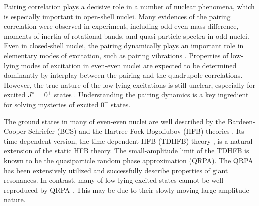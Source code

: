 \documentclass[%
superscriptaddress,
preprint,
showpacs,
nofootinbib,
amsmath,amssymb,
aps,
prc,
floatfix ]%
{revtex4-1}
\begin{document}
Pairing correlation plays a decisive role in a number of nuclear phenomena,
which is especially important in open-shell nuclei.
Many evidences of the pairing correlation were observed in experiment,
including odd-even mass difference, moments of inertia of rotational bands,
and quasi-particle spectra in odd nuclei.
Even in closed-shell nuclei, the pairing dynamically plays an important
role in elementary modes of excitation, such as pairing vibrations
\cite{BM75, RS80, BB05}.
Properties of low-lying modes of excitation in even-even nuclei are
expected to be determined dominantly by interplay between
the pairing and the quadrupole correlations.
However, the true nature of the low-lying excitations is still unclear,
especially for excited $J^\pi=0^+$ states \cite{garrett,HW11}.
Understanding the pairing dynamics is a key ingredient for solving
mysteries of excited $0^+$ states.

The ground states in many of even-even nuclei are well
described by the Bardeen-Cooper-Schriefer (BCS)
and the Hartree-Fock-Bogoliubov (HFB) theories \cite{RS80,BHR03}.
Its time-dependent version, 
the time-dependent HFB (TDHFB) theory \cite{BR86,NMMY16},
is a natural extension of the static HFB theory.
The small-amplitude limit of the TDHFB is known to be 
the quasiparticle random phase approximation (QRPA).
The QRPA has been extensively utilized and successfully
describe properties of giant resonances.
In contrast, many of low-lying excited states
cannot be well reproduced by QRPA \cite{NMMY16}.
This may be due to their slowly moving large-amplitude nature.

\end{document}
